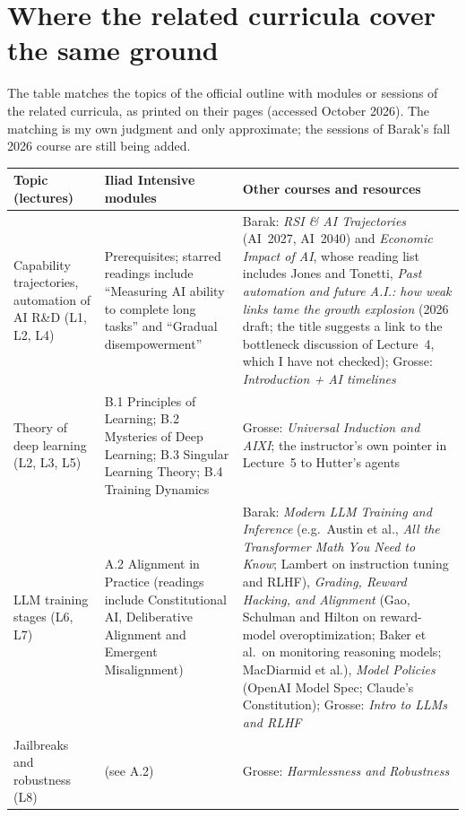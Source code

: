 \section*{Where the related curricula cover the same ground}
\begin{beyond}
The table matches the topics of the official outline with modules or sessions of the related curricula, as printed on their pages (accessed October 2026). The matching is my own judgment and only approximate; the sessions of Barak's fall 2026 course are still being added.
\end{beyond}
\footnotesize
\renewcommand{\arraystretch}{1.25}
\begin{tabular}{@{}>{\raggedright\arraybackslash}p{27mm}>{\raggedright\arraybackslash}p{37mm}>{\raggedright\arraybackslash}p{55mm}@{}}
\toprule
\textbf{Topic (lectures)} & \textbf{Iliad Intensive modules} & \textbf{Other courses and resources}\\
\midrule
Capability trajectories, automation of AI R\&D (L1, L2, L4) & Prerequisites; starred readings include ``Measuring AI ability to complete long tasks'' and ``Gradual disempowerment'' & Barak: \emph{RSI \& AI Trajectories} (AI~2027, AI~2040) and \emph{Economic Impact of AI}, whose reading list includes Jones and Tonetti, \emph{Past automation and future A.I.: how weak links tame the growth explosion} (2026 draft; the title suggests a link to the bottleneck discussion of Lecture~4, which I have not checked); Grosse: \emph{Introduction + AI timelines}\\
Theory of deep learning (L2, L3, L5) & B.1 Principles of Learning; B.2 Mysteries of Deep Learning; B.3 Singular Learning Theory; B.4 Training Dynamics & Grosse: \emph{Universal Induction and AIXI}; the instructor's own pointer in Lecture~5 to Hutter's agents\\
LLM training stages (L6, L7) & A.2 Alignment in Practice (readings include Constitutional AI, Deliberative Alignment and Emergent Misalignment) & Barak: \emph{Modern LLM Training and Inference} (e.g.\ Austin et al., \emph{All the Transformer Math You Need to Know}; Lambert on instruction tuning and RLHF), \emph{Grading, Reward Hacking, and Alignment} (Gao, Schulman and Hilton on reward-model overoptimization; Baker et al.\ on monitoring reasoning models; MacDiarmid et al.), \emph{Model Policies} (OpenAI Model Spec; Claude's Constitution); Grosse: \emph{Intro to LLMs and RLHF}\\
Jailbreaks and robustness (L8) & (see A.2) & Grosse: \emph{Harmlessness and Robustness}\\

\end{tabular}
